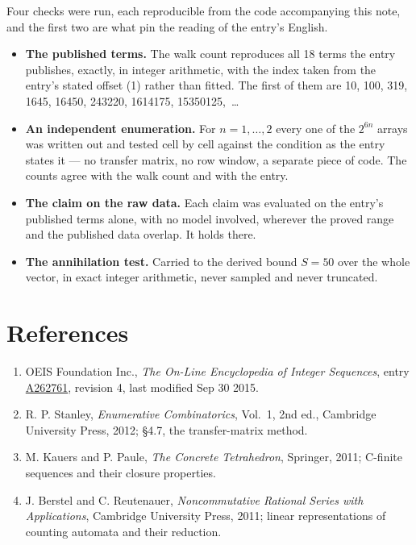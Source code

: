 \documentclass[11pt]{article}
\theoremstyle{definition}
\begin{document}
Four checks were run, each reproducible from the code accompanying this note, and the first two are what pin the reading of the entry's English.

\begin{itemize}

\item {\bfseries The published terms.} The walk count reproduces all 18 terms the entry publishes, exactly, in integer arithmetic, with the index taken from the entry's stated offset (1) rather than fitted. The first of them are 10, 100, 319, 1645, 16450, 243220, 1614175, 15350125,~\dots

\item {\bfseries An independent enumeration.} For $n = 1,\dots,2$ every one of the $2^{6n}$ arrays was written out and tested cell by cell against the condition as the entry states it --- no transfer matrix, no row window, a separate piece of code. The counts agree with the walk count and with the entry.

\item {\bfseries The claim on the raw data.} Each claim was evaluated on the entry's published terms alone, with no model involved, wherever the proved range and the published data overlap. It holds there.

\item {\bfseries The annihilation test.} Carried to the derived bound $S = 50$ over the whole vector, in exact integer arithmetic, never sampled and never truncated.

\end{itemize}

\section{References}

\begin{enumerate}

\item OEIS Foundation Inc., \emph{The On-Line Encyclopedia of Integer Sequences}, entry \href{https://oeis.org/A262761}{A262761}, revision 4, last modified Sep 30 2015.

\item R. P. Stanley, \emph{Enumerative Combinatorics}, Vol.~1, 2nd ed., Cambridge University Press, 2012; \S4.7, the transfer-matrix method.

\item M. Kauers and P. Paule, \emph{The Concrete Tetrahedron}, Springer, 2011; C-finite sequences and their closure properties.

\item J. Berstel and C. Reutenauer, \emph{Noncommutative Rational Series with Applications}, Cambridge University Press, 2011; linear representations of counting automata and their reduction.

\end{enumerate}
\end{document}
